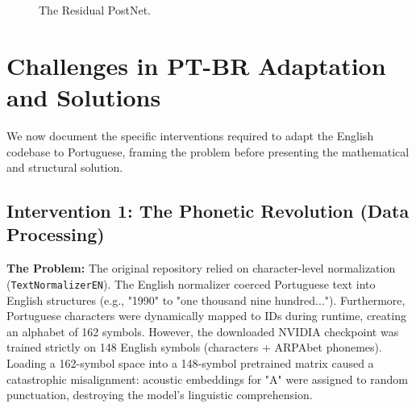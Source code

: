 \documentclass[12pt]{article}
\newcommand{\pathtt}[1]{\texttt{#1}}
\begin{document}
\begin{figure}[H]
\centering
{}
\caption{The Residual PostNet.}
\end{figure}


\section{Challenges in PT-BR Adaptation and Solutions}

We now document the specific interventions required to adapt the English codebase to Portuguese, framing the problem before presenting the mathematical and structural solution.

\subsection{Intervention 1: The Phonetic Revolution (Data Processing)}
\textbf{The Problem:} 
The original repository relied on character-level normalization (\pathtt{TextNormalizerEN}). The English normalizer coerced Portuguese text into English structures (e.g., "1990" to "one thousand nine hundred..."). Furthermore, Portuguese characters were dynamically mapped to IDs during runtime, creating an alphabet of 162 symbols. However, the downloaded NVIDIA checkpoint was trained strictly on 148 English symbols (characters + ARPAbet phonemes). Loading a 162-symbol space into a 148-symbol pretrained matrix caused a catastrophic misalignment: acoustic embeddings for "A" were assigned to random punctuation, destroying the model's linguistic comprehension.
\end{document}
